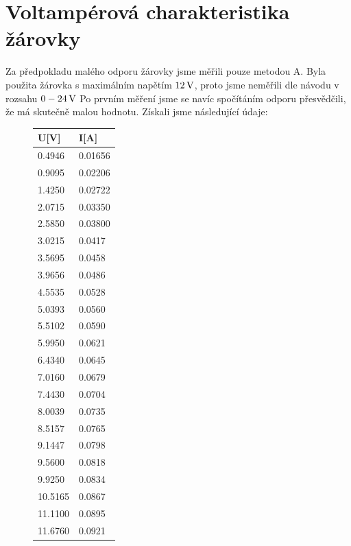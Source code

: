 \documentclass[czech,11pt,a4paper]{article}
\begin{document}
	
	

	
	\section{Voltampérová charakteristika žárovky}
	Za předpokladu malého odporu žárovky jsme měřili pouze metodou A. Byla použita žárovka s maximálním napětím $12 \,\rm V$, proto jsme neměřili dle návodu v rozsahu $0-24\,\rm V$ Po prvním měření jsme se navíc spočítáním odporu přesvědčili, že má skutečně malou hodnotu. Získali jsme následující údaje:
	\begin{figure}[H]
			\begin{center}
				\begin{tabular}{l|l}
					U{[}V{]} & I{[}A{]} \\ \hline
					0.4946   & 0.01656  \\ \hline
					0.9095   & 0.02206  \\ \hline
					1.4250    & 0.02722  \\ \hline
					2.0715   & 0.03350   \\ \hline
					2.5850   & 0.03800    \\ \hline
					3.0215   & 0.0417  \\ \hline
					3.5695   & 0.0458   \\ \hline
					3.9656   & 0.0486   \\ \hline
					4.5535   & 0.0528   \\ \hline
					5.0393   & 0.0560   \\ \hline
					5.5102   & 0.0590    \\ \hline
					5.9950    & 0.0621   \\ \hline
					6.4340    & 0.0645   \\ \hline
					7.0160    & 0.0679   \\ \hline
					7.4430   & 0.0704   \\ \hline
					8.0039   & 0.0735   \\ \hline
					8.5157   & 0.0765   \\ \hline
					9.1447   & 0.0798   \\ \hline
					9.5600     & 0.0818   \\ \hline
					9.9250    & 0.0834   \\ \hline
					10.5165  & 0.0867   \\ \hline
					11.1100    & 0.0895   \\ \hline
					11.6760   & 0.0921  
				\end{tabular}
			\end{center}
		
	
	\end{figure}
	
\end{document}
